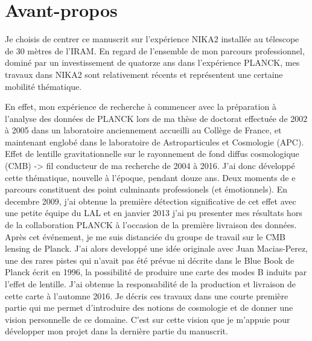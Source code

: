 \documentclass[a4paper, 12pt]{report}
\begin{document}




%
\newpage
\tableofcontents
\newpage


% 
%

\chapter*{Avant-propos}

Je choisis de centrer ce manuscrit sur l'expérience NIKA2 installée au
télescope de 30 mètres de l'IRAM. En regard de l'ensemble de mon parcours
professionnel, dominé par un investissement de quatorze ans dans
l'expérience PLANCK, mes travaux dans NIKA2 sont relativement récents
et représentent une certaine mobilité thématique.

En effet, mon expérience de recherche à commencer avec la préparation
à l'analyse des données de PLANCK lors de ma thèse de doctorat
effectuée de 2002 à 2005 dans un laboratoire anciennement accueilli au
Collège de France, et maintenant englobé dans le laboratoire
de Astroparticules et Cosmologie (APC). Effet de lentille
gravitationnelle sur le rayonnement de fond diffus cosmologique (CMB)
-> fil conducteur de ma recherche de 2004 à 2016. J'ai donc développé
cette thématique, nouvelle à l'époque, pendant douze ans. Deux moments
de e parcours constituent des point culminants professionels (et
émotionnels). En decembre 2009, j'ai obtenue la première détection
significative de cet effet avec une petite équipe du LAL et en janvier
2013 j'ai pu presenter mes résultats hors de la collaboration PLANCK à
l'occasion de la première livraison des données. Après cet événement, je me suis
distanciée du groupe de travail sur le CMB lensing de Planck. J'ai
alors developpé une idée originale avec Juan Macias-Perez, une des
rares pistes qui n'avait pas été prévue ni décrite dans le Blue Book
de Planck écrit en 1996, la possibilité de produire une carte des
modes B induits par l'effet de lentille. J'ai obtenue la
responsabilité de la production et livraison de cette carte à
l'automne 2016. Je décris ces travaux dans une courte première partie
qui me permet d'introduire des notions de cosmologie et de donner une
vision personnelle de ce domaine. C'est sur cette vision que je
m'appuie pour développer mon projet dans la dernière partie du
manuscrit.
\end{document}
